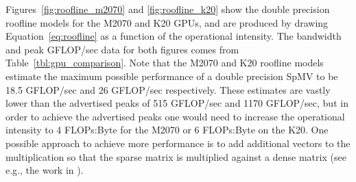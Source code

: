 \documentclass{report}
\begin{document}
Figures~\ref{fig:roofline_m2070} and \ref{fig:roofline_k20} show the double precision roofline models for the M2070 and K20 GPUs, and are produced by drawing Equation~\ref{eq:roofline} as a function of the operational intensity. The bandwidth and peak GFLOP/sec data for both figures comes from Table~\ref{tbl:gpu_comparison}. Note that the M2070 and K20 roofline models estimate the maximum possible performance of a double precision SpMV to be 18.5 GFLOP/sec and 26 GFLOP/sec respectively. These estimates are vastly lower than the advertised peaks of 515 GFLOP/sec and 1170 GFLOP/sec, but in order to achieve the advertised peaks one would need to increase the operational intensity to 4 FLOPs:Byte for the M2070 or 6 FLOPs:Byte on the K20. One possible approach to achieve more performance is to add additional vectors to the multiplication so that the sparse matrix is multiplied against a dense matrix (see e.g., the work in \cite{ErlebacherSauleFlyerBollig2013}). 
\end{document}
